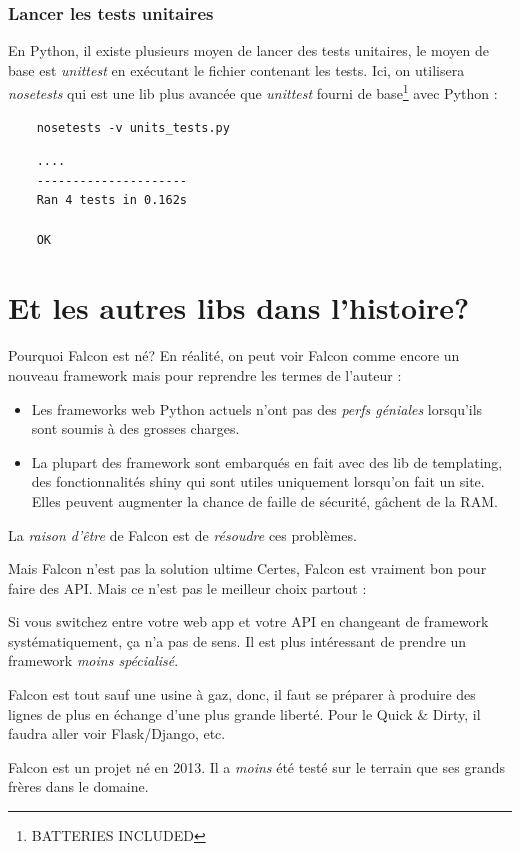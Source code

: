 \documentclass[10pt, compress]{beamer}
\begin{document}
\begin{frame}[fragile]
	\frametitle{Lancer les tests unitaires}
   	En Python, il existe plusieurs moyen de lancer des tests unitaires, le moyen de base est \emph{unittest} en exécutant le fichier contenant les tests.
   	\pause
    Ici, on utilisera \emph{nosetests} qui est une lib plus avancée que \emph{unittest} fourni de base\footnote{BATTERIES INCLUDED} avec Python :
    \pause
    \begin{verbatim}
    nosetests -v units_tests.py
    \end{verbatim}
    \pause
    \begin{verbatim}
    ....
    ---------------------
    Ran 4 tests in 0.162s

    OK
    \end{verbatim}
    
\end{frame}
\section{Et les autres libs dans l'histoire?}
\begin{frame}{Pourquoi Falcon est né?}
	En réalité, on peut voir Falcon comme encore un nouveau framework mais pour reprendre les termes de l'auteur :
	\pause
    \begin{itemize}[<+->]
    \item Les frameworks web Python actuels n'ont pas des \emph{perfs géniales} lorsqu'ils sont soumis à des \alert{grosses charges}. 
    \item La plupart des framework sont embarqués en fait avec des lib de templating, des fonctionnalités shiny qui sont \alert{utiles} uniquement lorsqu'on fait un site. Elles peuvent augmenter la chance de \alert{faille de sécurité}, gâchent de la RAM.
    \end{itemize}
    \pause
	La \emph{raison d'être} de Falcon est de \emph{résoudre} ces problèmes.
\end{frame}
\begin{frame}{Mais Falcon n'est pas la solution ultime}
	Certes, Falcon est vraiment bon pour faire des API. Mais ce n'est pas le meilleur choix partout :
	\pause
    \begin{description}[<+->]
    	\item[DRY] Si vous switchez entre votre web app et votre API en changeant de framework systématiquement, ça n'a pas de sens. Il est plus intéressant de prendre un framework \emph{moins spécialisé}.
        \item[Usine à gaz] Falcon est tout sauf une usine à gaz, donc, il faut se préparer à produire des lignes de plus en échange d'une plus grande liberté. Pour le \alert{Quick \& Dirty}, il faudra aller voir Flask/Django, etc.
        \item[Maturité] Falcon est un projet né en 2013. Il a \emph{moins} été \alert{testé sur le terrain} que ses grands frères dans le domaine.
    \end{description}
\end{frame}
\end{document}
